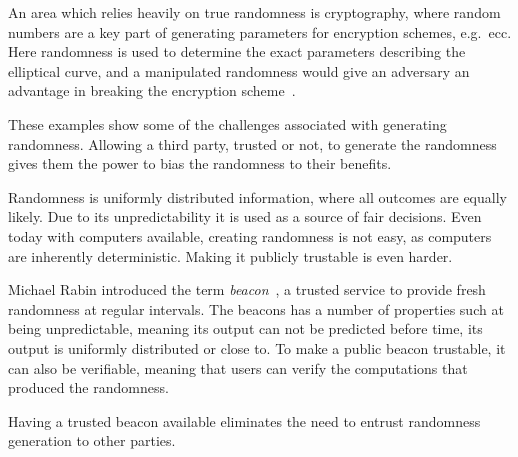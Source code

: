 An area which relies heavily on true randomness is cryptography, where random numbers are a key part of generating parameters for encryption schemes, e.g.\ \gls{ecc}.
Here randomness is used to determine the exact parameters describing the elliptical curve, and a manipulated randomness would give an adversary an advantage in breaking the encryption scheme~\cite{bernstein2015manipulate}.


These examples show some of the challenges associated with generating randomness. Allowing a third party, trusted or not, to generate the randomness gives them the power to bias the randomness to their benefits.

Randomness is uniformly distributed information, where all outcomes are equally likely. Due to its unpredictability it is used as a source of fair decisions. Even today with computers available, creating randomness is not easy, as computers are inherently deterministic. Making it publicly trustable is even harder. 

Michael Rabin introduced the term \emph{beacon}~\cite{rabin1983transaction}, a trusted service to provide fresh randomness at regular intervals. The beacons has a number of properties such at being unpredictable, meaning its output can not be predicted before time, its output is uniformly distributed or close to. To make a public beacon trustable, it can also be verifiable, meaning that users can verify the computations that produced the randomness. 

Having a trusted beacon available eliminates the need to entrust randomness generation to other parties.

